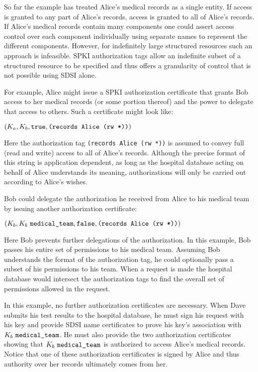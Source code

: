 So far the example has treated Alice's medical records as a single
entity.  If access is granted to any part of Alice's records, access
is granted to all of Alice's records. If Alice's medical records
contain many components one could assert access control over each
component individually using separate names to represent the different
components. However, for indefinitely large structured resources such
an approach is infeasible.  SPKI authorization tags allow an
indefinite subset of a structured resource to be specified and thus
offers a granularity of control that is not possible using SDSI alone.

For example, Alice might issue a SPKI authorization certificate that
grants Bob access to her medical records (or some portion thereof) and
the power to delegate that access to others. Such a certificate might
look like:

\vspace{1.5ex}
\centerline{$(K_a, K_b, \text{\tt true}, \text{\tt (records Alice (rw *))})$}
\vspace{1.5ex}
\noindent Here the authorization tag \texttt{(records Alice (rw *))} is assumed
to convey full (read and write) access to all of Alice's
records. Although the precise format of this string is application
dependent, as long as the hospital database acting on behalf of Alice
understands its meaning, authorizations will only be carried out
according to Alice's wishes.

Bob could delegate the authorization he received from Alice to his
medical team by issuing another authorization certificate:

\vspace{1.5ex}
\centerline{$(K_b, K_b\,\,\text{\tt medical\_team}, \text{\tt false},
  \text{\tt (records Alice (rw *))})$}
\vspace{1.5ex}
\noindent Here Bob prevents further delegations of the authorization. In this
example, Bob passes his entire set of permissions to his medical team.
Assuming Bob understands the format of the authorization tag, he could
optionally pass a subset of his permissions to his team. When a
request is made the hospital database would intersect the
authorization tags to find the overall set of permissions allowed in
the request.

In this example, no further authorization certificates are necessary. When
Dave submits his test results to the hospital database, he must sign his
request with his key and provide SDSI name certificates to prove his key's
association with $K_b\,\,\text{\tt medical\_team}$. He must also provide
the two authorization certificates showing that $K_b\,\,\text{\tt
medical\_team}$ is authorized to access Alice's medical records. Notice
that one of these authorization certificates is signed by Alice and thus
authority over her records ultimately comes from her.



